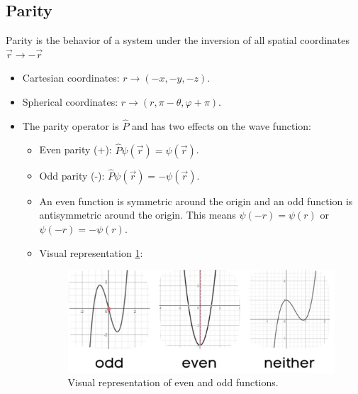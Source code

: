 \subsection{Parity}
Parity is the behavior of a system under the inversion of all spatial coordinates $\vec{r} → - \vec{r}$
\begin{itemize}
    \item Cartesian coordinates: $r → (-x, -y, -z)$. 
    \item Spherical coordinates: $r → (r, π-θ, φ + π)$.
    \item The parity operator is $\hat{P}$ and has two effects on the wave function: 
    \begin{itemize}
        \item Even parity (+): $\hat{P}ψ(\vec{r}) = ψ(\vec{r})$.
        \item Odd parity (-): $\hat{P}ψ(\vec{r}) = -ψ(\vec{r})$.
        \item An even function is symmetric around the origin and an odd function is antisymmetric around the origin. This means $ψ(-r) = ψ(r)$ or $ψ(-r) = -ψ(r)$. 
        \item Visual representation \cref{fig: even_vs_odd_function}:
        \begin{figure}[h!]
        \centering
        \includegraphics[width = .75\textwidth]{even_vs_odd_function.png}
        \caption{Visual representation of even and odd functions.}
        \label{fig: even_vs_odd_function}
        \end{figure}
    \end{itemize} 
\end{itemize}
